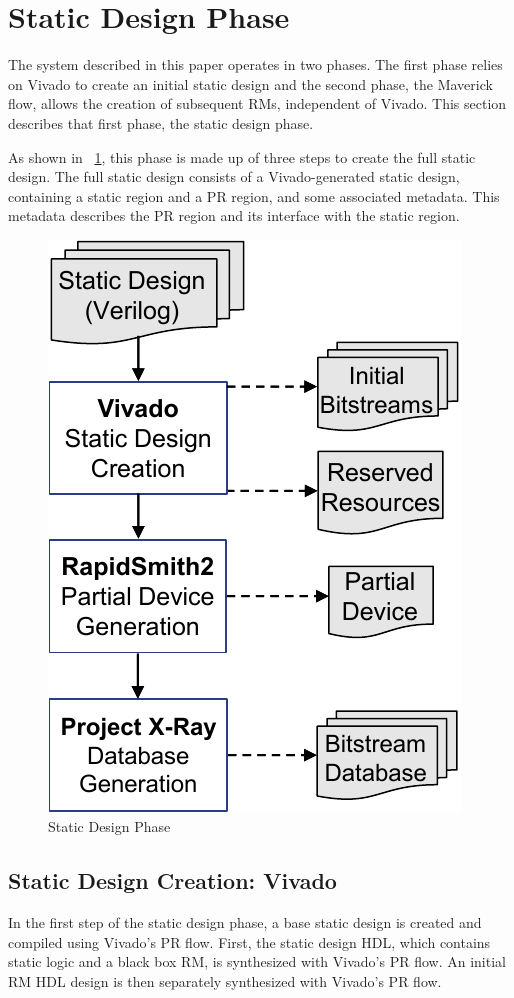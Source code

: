 \section{Static Design Phase}
\label{sec:static_system}
The system described in this paper operates in two phases.
The first phase relies on Vivado to create an initial static design and the second phase, the Maverick flow, allows the creation of subsequent RMs, independent of Vivado.
This section describes that first phase, the static design phase.

As shown in \figurename~\ref{fig:static_system}, this phase is made up of three steps to create the full static design.
The full static design consists of a Vivado-generated static design, containing a static region and a PR region, and some associated metadata.
This metadata describes the PR region and its interface with the static region.

\begin{figure}
	\centering
	\includegraphics[height=.68\columnwidth]{figures/static_system.pdf}
	\caption{Static Design Phase}
	\label{fig:static_system}
\end{figure}

\subsection{Static Design Creation: Vivado}
In the first step of the static design phase, a base static design is created and compiled using Vivado's PR flow.
First, the static design HDL, which contains static logic and a black box RM, is synthesized with Vivado's PR flow. 
An initial RM HDL design is then separately synthesized with Vivado's PR flow.

